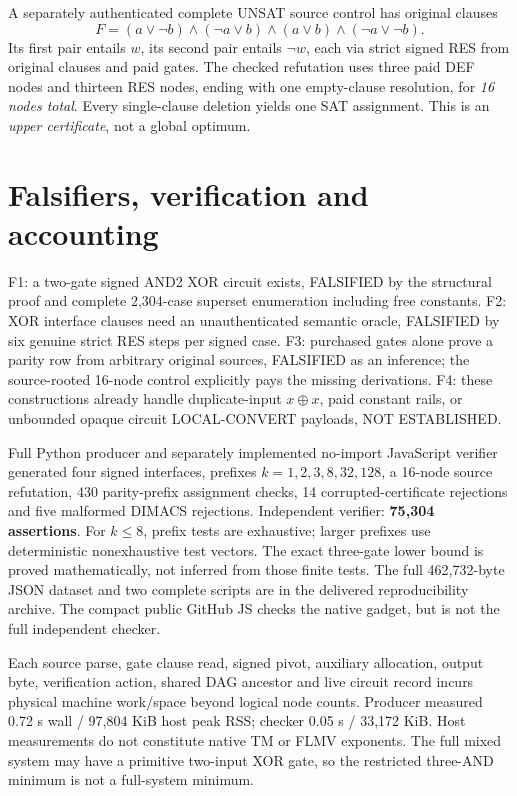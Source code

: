 \documentclass[11pt]{article}
\begin{document}
A separately authenticated complete UNSAT source control has original clauses
\[
F=(a\vee\neg b)\wedge(\neg a\vee b)\wedge(a\vee b)\wedge(\neg a\vee\neg b).
\]
Its first pair entails \(w\), its second pair entails \(\neg w\), each via strict signed RES from original clauses and paid gates. The checked refutation uses three paid DEF nodes and thirteen RES nodes, ending with one empty-clause resolution, for \emph{16 nodes total}. Every single-clause deletion yields one SAT assignment. This is an \emph{upper certificate}, not a global optimum.

\section*{Falsifiers, verification and accounting}
F1: a two-gate signed AND2 XOR circuit exists, FALSIFIED by the structural proof and complete 2,304-case superset enumeration including free constants. F2: XOR interface clauses need an unauthenticated semantic oracle, FALSIFIED by six genuine strict RES steps per signed case. F3: purchased gates alone prove a parity row from arbitrary original sources, FALSIFIED as an inference; the source-rooted 16-node control explicitly pays the missing derivations. F4: these constructions already handle duplicate-input \(x\oplus x\), paid constant rails, or unbounded opaque circuit LOCAL-CONVERT payloads, NOT ESTABLISHED.

Full Python producer and separately implemented no-import JavaScript verifier generated four signed interfaces, prefixes \(k=1,2,3,8,32,128\), a 16-node source refutation, 430 parity-prefix assignment checks, 14 corrupted-certificate rejections and five malformed DIMACS rejections. Independent verifier: \textbf{75,304 assertions}. For \(k\le 8\), prefix tests are exhaustive; larger prefixes use deterministic nonexhaustive test vectors. The exact three-gate lower bound is proved mathematically, not inferred from those finite tests. The full 462,732-byte JSON dataset and two complete scripts are in the delivered reproducibility archive. The compact public GitHub JS checks the native gadget, but is not the full independent checker.

Each source parse, gate clause read, signed pivot, auxiliary allocation, output byte, verification action, shared DAG ancestor and live circuit record incurs physical machine work/space beyond logical node counts. Producer measured 0.72 s wall / 97,804 KiB host peak RSS; checker 0.05 s / 33,172 KiB. Host measurements do not constitute native TM or FLMV exponents. The full mixed system may have a primitive two-input XOR gate, so the restricted three-AND minimum is not a full-system minimum.
\end{document}
